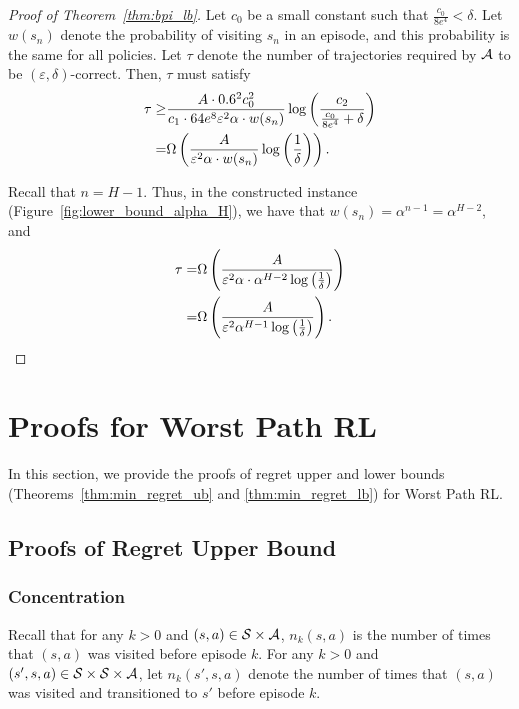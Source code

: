 \begin{proof}[Proof of Theorem~\ref{thm:bpi_lb}]
	
	Let $c_0$ be a small constant such that $\frac{c_0}{8e^4} < \delta$. Let $w(s_n)$ denote the probability of visiting $s_n$ in an episode, and this probability is the same for all policies. 
	Let $\tau$ denote the number of trajectories required by $\mathcal{A}$ to be $(\varepsilon,\delta)$-correct.
	Then, $\tau$ must satisfy
	\begin{align*}
		\tau \geq & \frac{A \cdot 0.6^2 c_0^2 }{c_1 \cdot 64 e^8 \varepsilon^2 \alpha \cdot w(s_n)} \log \left( \frac{c_2}{\frac{c_0}{8e^4} + \delta} \right)
		\\
		= & \Omega \left(  \frac{ A}{\varepsilon^2 \alpha \cdot w(s_n)} \log \left( \frac{1}{\delta} \right)  \right) .
	\end{align*}
	
	Recall that $n=H-1$.
	Thus, in the constructed instance (Figure~\ref{fig:lower_bound_alpha_H}), we have that $w(s_n)=\alpha^{n-1}=\alpha^{H-2}$, and
	\begin{align*}
		\tau = & \Omega \left(  \frac{ A}{\varepsilon^2 \alpha \cdot \alpha^{H-2} \log \left( \frac{1}{\delta} \right) }  \right)
		\\
		= & \Omega \left(  \frac{ A}{\varepsilon^2 \alpha^{H-1} \log \left( \frac{1}{\delta} \right) }  \right) .
	\end{align*}
\end{proof}



\section{Proofs for Worst Path RL}

In this section, we provide the proofs of regret upper and lower bounds (Theorems~\ref{thm:min_regret_ub} and \ref{thm:min_regret_lb}) for Worst Path RL.

\subsection{Proofs of Regret Upper Bound}


\subsubsection{Concentration}

Recall that for any $k>0$ and $(s,a) \in \mathcal{S} \times \mathcal{A}$, $n_k(s,a)$ is the number of times that $(s,a)$ was visited before episode $k$.
For any $k>0$ and $(s',s,a)\in \mathcal{S} \times \mathcal{S} \times \mathcal{A}$, let $n_k(s',s,a)$ denote the number of times that $(s,a)$ was visited and transitioned to $s'$ before episode $k$.

